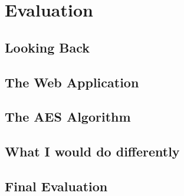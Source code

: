 %
%

\newpage
\chapter{Evaluation}

\section{Looking Back}

\section{The Web Application}

\section{The AES Algorithm}

\section{What I would do differently}

\section{Final Evaluation}